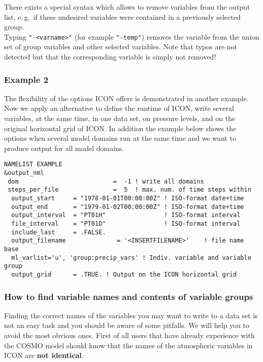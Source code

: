      There exists a special syntax which allows to remove variables from the output list, e.\,g.\ if
      these undesired variables were contained in a previously selected group.\\
      Typing \texttt{"-\textnormal{<varname>}"} (for example \texttt{"-temp"}) removes the
      variable from the union set of group variables and other selected variables.
      Note that typos are not detected but that the corresponding variable is
      simply not removed!




\subsubsection{Example 2}

The flexibility of the options ICON offers is demonstrated in another example. Now we apply an alternative to define the runtime of ICON, write several variables, at the same time, in one data set, on pressure levels, and on the original horizontal grid of ICON. In addition the example below shows the options when several model domains run at the same time and we want to produce output for all model domains.

\begin{Verbatim}[frame=single]
NAMELIST EXAMPLE
&output_nml
 dom                          =  -1 ! write all domains
 steps_per_file               =  5  ! max. num. of time steps within
  output_start     = "1978-01-01T00:00:00Z" ! ISO-format date+time
  output_end       = "1979-01-02T00:00:00Z" ! ISO-format date+time
  output_interval  = "PT01H"                ! ISO-format interval
  file_interval    = "PT01D"                ! ISO-format interval
  include_last     = .FALSE.
  output_filename              = '<INSERTFILENAME>'    ! file name base
  ml_varlist='u', 'group:precip_vars' ! Indiv. variable and variable group
  output_grid      = .TRUE. ! Output on the ICON horizontal grid
\end{Verbatim}

\subsubsection{How to find variable names and contents of variable groups}

Finding the correct names of the variables you may want to write to a data set is not an easy task and you should be aware of some pitfalls. We will help you to avoid the most obvious ones. First of all users that have already experience with the COSMO model should know that the names of the atmospheric variables in ICON are \textbf{not identical}. 

